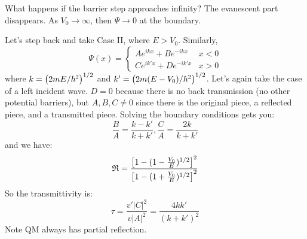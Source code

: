 What happens if the barrier step approaches infinity? The evanescent part disappears. As $V_0 \to \infty$, then $\Psi \to 0$ at the boundary.

Let's step back and take Case II, where $E > V_0$. Similarly,
\[ \Psi(x) = \begin{cases}
    Ae^{ikx} + Be^{-ikx} & x < 0 \\
    Ce^{ik'x} + De^{-ik'x} & x > 0
\end{cases} \]
where $k = \qty(2mE/\hbar^2)^{1/2}$ and $k' = \qty(2m(E - V_0)/\hbar^2)^{1/2}$. Let's again take the case of a left incident wave. $D = 0$ because there is no
back transmission (no other potential barriers), but $A, B, C \neq 0$ since there is the original piece, a reflected piece, and a transmitted piece.
Solving the boundary conditions gets you:
\[ \frac{B}{A} = \frac{k - k'}{k + k'}, \frac{C}{A} = \frac{2k}{k + k'} \]
and we have:
\[ \mathfrak{R} = \frac{\qty[1 - (1 - \frac{V_0}{E})^{1/2}]^2}{\qty[1 - (1 + \frac{V_0}{E})^{1/2}]^2} \]
So the transmittivity is:
\[ \tau = \frac{v' |C|^2}{v |A|^2} = \frac{4kk'}{(k + k')^2} \]
Note QM always has partial reflection.